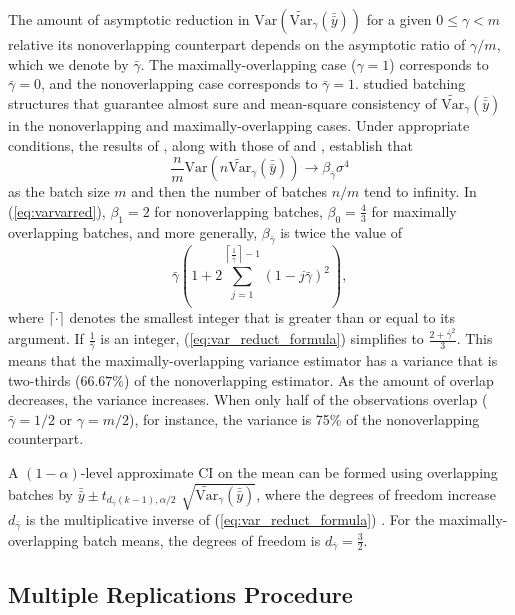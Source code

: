 \documentclass[12pt]{article}
\newcommand{\var}[1]{\mathrm{Var} \left( #1 \right)}
\newcommand{\vartg}[1]{\widetilde{\mathrm{Var}}_\gamma \left( #1 \right)}
\newcommand{\vtm}[1]{\widetilde{\mathrm{Var}}_{m} \left( #1 \right)}
\newcommand{\gammab}{\bar{\gamma}}
\newcommand{\ogb}{\tfrac{1}{\gammab}}
\newcommand{\cogb}{\left\lceil\ogb\right\rceil}
\newcommand{\yb}{\bar{y}}
\newcommand{\ybb}{\bar{\yb}}
\begin{document}
The amount of asymptotic reduction in $\var{\vartg{\ybb}}$ for a given $0\leq \gamma< m$ relative its nonoverlapping counterpart 
depends on the asymptotic ratio of $\gamma/m$, which we denote by $\gammab$. 
The maximally-overlapping case ($\gamma = 1$) corresponds to $\gammab=0$, and the nonoverlapping case corresponds to $\gammab=1$. 
\cite{damerdji1994strong,damerdji1995mean} studied batching structures that guarantee almost sure and mean-square consistency of $\vartg{\ybb}$ in the nonoverlapping and maximally-overlapping cases. 
Under appropriate conditions, the results of \cite{damerdji1995mean}, along with those of \cite{Meketon1984} and \cite{Welch1987}, establish that 
\begin{equation}
\label{eq:varvarred}
\frac{n}{m}\var{n \vartg{\ybb}} \rightarrow \beta_{\gammab} \sigma^4
\end{equation}
as the batch size $m$ and then the number of batches $n/m$ tend to infinity. 
In (\ref{eq:varvarred}), $\beta_1 = 2$ for nonoverlapping batches, $\beta_0 = \frac{4}{3}$ for maximally overlapping batches, and more generally, $\beta_{\gammab}$ is twice the value of 
\begin{equation} \label{eq:var_reduct_formula}
	\gammab \left( 1 + 2 \sum_{j=1}^{\cogb-1} (1-j\gammab)^2 \right),
\end{equation}
where $\lceil \cdot \rceil$ denotes the smallest integer that is greater than or equal to its argument.
If $\ogb$ is an integer, (\ref{eq:var_reduct_formula}) simplifies to $\frac{2+\gammab^2}{3}$.
This means that the maximally-overlapping variance estimator has a variance that is two-thirds ($66.67\%$) of the nonoverlapping estimator.
As the amount of overlap decreases, the variance increases. 
When only half of the observations overlap ($\gammab = 1/2$ or $\gamma=m/2$), for instance, the variance is 75\% of the nonoverlapping counterpart.


A $(1-\alpha)$-level approximate CI on the mean can be formed using overlapping batches by $\ybb \pm t_{d_{\gammab}(k-1),\alpha/2}$ $\sqrt{\vartg{\ybb}}$, where the degrees of freedom increase $d_{\gammab}$ is the multiplicative inverse of (\ref{eq:var_reduct_formula}) \citep{Welch1987}.  
For the maximally-overlapping batch means, the degrees of freedom is $d_{\gammab} = \frac{3}{2}$.

 
\subsection{Multiple Replications Procedure} 
\label{ssec:mrp}
\end{document}
